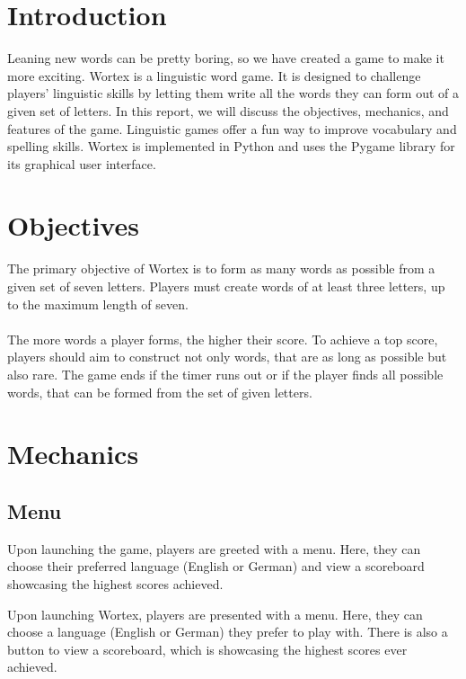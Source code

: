 \documentclass{article}[12pt]
\begin{document}
    
    
    \onecolumn

    \section*{Introduction}

    Leaning new words can be pretty boring, so we have created a game to make
    it more exciting. Wortex is a linguistic word game. It is designed to
    challenge players' linguistic skills by letting them write all the words
    they can form out of a given set of letters. In this report, we will
    discuss the objectives, mechanics, and features of the game. Linguistic
    games offer a fun way to improve vocabulary and spelling skills. Wortex is
    implemented in Python and uses the Pygame library for its graphical user
    interface.

    \section*{Objectives}

    The primary objective of Wortex is to form as many words as possible from a
    given set of seven letters. Players must create words of at least three
    letters, up  to the maximum length of seven. \\\\ The more words a player
    forms, the higher their score. To achieve a top score, players should aim
    to construct not only words, that are as long as possible but also rare.
    The game ends if the timer runs out or if the player finds all possible
    words, that can be formed from the set of given letters.

    \section*{Mechanics}

    \subsection*{Menu}

    Upon launching the game, players are greeted with a menu. Here, they can
    choose their preferred language (English or German) and view a scoreboard
    showcasing the highest scores achieved.

    Upon launching Wortex, players are presented with a menu. Here, they can
    choose a language (English or German) they prefer to play with. There is also
    a button to view a scoreboard, which is showcasing the highest scores ever
    achieved.
\end{document}
